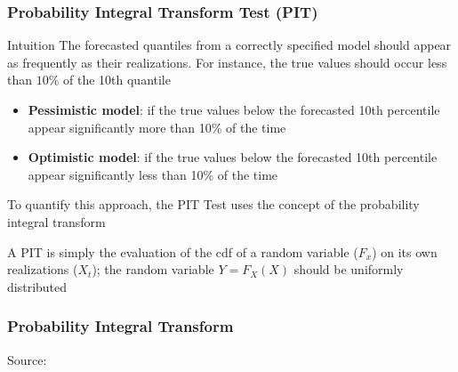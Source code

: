 \documentclass{beamer}
\newenvironment{wideitemize}{\itemize\addtolength{\itemsep}{10pt}}{\enditemize}
\begin{document}
\begin{frame}
  \frametitle{Probability Integral Transform Test (PIT)}

    \begin{exampleblock}{Intuition}
      The forecasted quantiles from a correctly specified model should appear as frequently as their realizations. For instance, the true values should occur less than $10\%$ of the 10th quantile
        \begin{itemize}
        \item \textbf{Pessimistic model}: if the true values below the forecasted 10th percentile appear significantly more than 10\% of the time
        \item \textbf{Optimistic model}: if the true values below the forecasted 10th percentile appear significantly less than 10\% of the time
        \end{itemize}      
    \end{exampleblock}
        
  \begin{wideitemize}
    \item To quantify this approach, the PIT Test uses the concept of the probability integral transform
    \item A PIT is simply the evaluation of the cdf of a random variable ($F_x$) on its own realizations ($X_t$); the random variable $Y = F_X(X)$ should be uniformly distributed
    \end{wideitemize}
    
\end{frame}


\begin{frame}
  \frametitle{Probability Integral Transform}
  \hspace*{15pt}\hbox{\scriptsize Source:}        
\end{frame}
\end{document}
